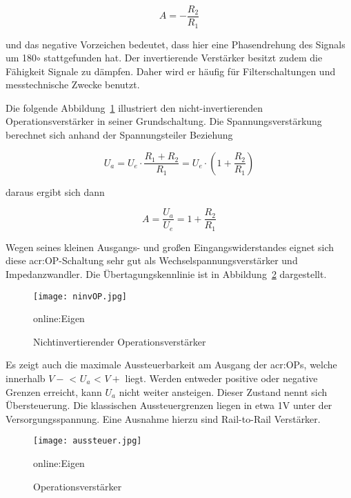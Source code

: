 \begin{equation}
	\label{equ:bsp1}
	A = - \frac{R_{2}}{R_{1}}
\end{equation}

und das negative Vorzeichen bedeutet, dass hier eine Phasendrehung des Signals um 180$\circ$ stattgefunden hat. Der invertierende Verstärker besitzt zudem die Fähigkeit Signale zu dämpfen. Daher wird er häufig für Filterschaltungen und messtechnische Zwecke benutzt. 

Die folgende Abbildung~\ref{fig:invOP} illustriert den nicht-invertierenden Operationsverstärker in seiner Grundschaltung. Die Spannungsverstärkung berechnet sich anhand der Spannungsteiler Beziehung

\begin{equation}
	\label{equ:bsp1}
	U_{a} = U_{e} \cdot \frac{R_{1} + R_{2}}{R_{1}} = U_{e} \cdot (1+ \frac{R_{2}}{R_{1}})
\end{equation}

daraus ergibt sich dann

\begin{equation}
	\label{equ:bsp1}
	A = \frac{U_{a}}{U_{e}} = 1+ \frac{R_{2}}{R_{1}}
\end{equation}

Wegen seines kleinen Ausgangs- und großen Eingangswiderstandes eignet sich diese \gls{acr:OP}-Schaltung sehr gut als  Wechselspannungsverstärker und Impedanzwandler. Die Übertagungskennlinie ist in Abbildung~\ref{fig:aussteuer} dargestellt. 

\begin{figure}[H]
	\centering
	\texttt{[image: ninvOP.jpg]}
	\caption[Nichtinvertierender Operationsverstärker]{Nichtinvertierender Operationsverstärker} 
	\gls{online:Eigen}
	\label{fig:invOP}
\end{figure}

Es zeigt auch die maximale Aussteuerbarkeit am Ausgang der \gls{acr:OP}s, welche innerhalb $V-$ < $U_{a}$ < $V+$ liegt. Werden entweder positive oder negative Grenzen erreicht, kann $U_{a}$ nicht weiter ansteigen. Dieser Zustand nennt sich Übersteuerung. Die klassischen Aussteuergrenzen liegen in etwa 1V unter der Versorgungsspannung.\cite{OP} Eine Ausnahme hierzu sind Rail-to-Rail Verstärker. 

\begin{figure}[H]
	\centering
	\texttt{[image: aussteuer.jpg]}
	\caption[Operationsverstärker]{Operationsverstärker} 
	\gls{online:Eigen}
	\label{fig:aussteuer}
\end{figure} 

